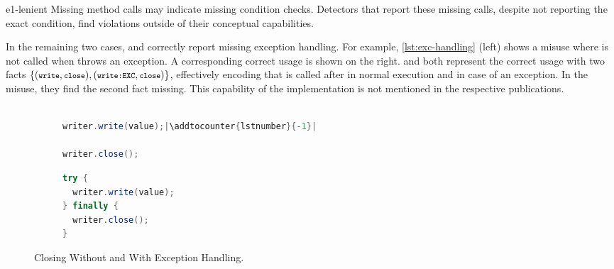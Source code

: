 \begin{obs}{e1-lenient}
  Missing method calls may indicate missing condition checks.
  Detectors that report these missing calls, despite not reporting the exact condition, find violations outside of their conceptual capabilities.
\end{obs}

\vspace{0.03in}
In the remaining two cases, \Jadet and \Tikanga correctly report missing exception handling.
For example, \autoref{lst:exc-handling} (left) shows a misuse where  is not called when  throws an exception.
A corresponding correct usage is shown on the right.
\Tikanga and \Jadet both represent the correct usage with two facts $\{ ({\texttt{\footnotesize{write}}}, {\texttt{\footnotesize{close}}}), ({\texttt{\footnotesize{write:EXC}}}, {\texttt{\footnotesize{close}}}) \}$, effectively encoding that  is called after  in normal execution and in case of an exception.
In the misuse, they find the second fact missing.
This capability of the implementation is not mentioned in the respective publications.

\begin{figure}[tb]
  \begin{subfigure}[t]{0.46\columnwidth}
    \begin{lstlisting}[language=java,numberblanklines=false,escapeinside=||,firstnumber=0]

writer.write(value);|\addtocounter{lstnumber}{-1}|

writer.close();
\end{lstlisting}
  \end{subfigure}
  \begin{subfigure}[t]{0.46\columnwidth}
    \begin{lstlisting}[language=java]
try {
  writer.write(value);
} finally {
  writer.close();
}
    \end{lstlisting}
  \end{subfigure}
  \caption{Closing  Without and With Exception Handling.}
  \label{lst:exc-handling}
\end{figure}


